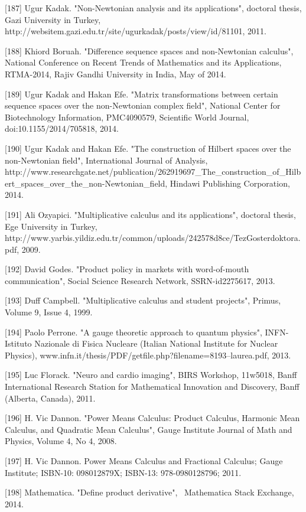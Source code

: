\documentclass[12pt]{article}
\begin{document}
[187] Ugur Kadak. "Non-Newtonian analysis and its applications", doctoral thesis, Gazi University in Turkey, http://websitem.gazi.edu.tr/site/ugurkadak/posts/view/id/81101, 2011.

[188] Khiord Boruah. "Difference sequence spaces and non-Newtonian calculus", National Conference on Recent Trends of Mathematics and its Applications, RTMA-2014, Rajiv Gandhi University in India, May of 2014.

[189] Ugur Kadak and Hakan Efe. "Matrix transformations between certain sequence spaces over the non-Newtonian complex field", National Center for Biotechnology Information, PMC4090579, Scientific World Journal, doi:10.1155/2014/705818, 2014.

[190] Ugur Kadak and Hakan Efe. "The construction of Hilbert spaces over the non-Newtonian field", International Journal of Analysis, http://www.researchgate.net/publication/262919697_The_construction_of_Hilbert_spaces_over_the_non-Newtonian_field, Hindawi Publishing Corporation, 2014.

[191] Ali Ozyapici. "Multiplicative calculus and its applications", doctoral thesis, Ege University in Turkey, http://www.yarbis.yildiz.edu.tr/common/uploads/242578d8ce/TezGosterdoktora.pdf, 2009.

[192] David Godes. "Product policy in markets with word-of-mouth communication", Social Science Research Network, SSRN-id2275617, 2013.

[193] Duff Campbell. "Multiplicative calculus and student projects", Primus, Volume 9, Issue 4, 1999.

[194] Paolo Perrone. "A gauge theoretic approach to quantum physics", INFN-Istituto Nazionale di Fisica Nucleare (Italian National Institute for Nuclear Physics), www.infn.it/thesis/PDF/getfile.php?filename=8193--laurea.pdf, 2013.

[195] Luc Florack. "Neuro and cardio imaging", BIRS Workshop, 11w5018, Banff International Research Station for Mathematical Innovation and Discovery, Banff (Alberta, Canada), 2011.

[196] H. Vic Dannon. "Power Means Calculus: Product Calculus, Harmonic Mean Calculus, and Quadratic Mean Calculus", Gauge Institute Journal of Math and Physics, Volume 4, No 4, 2008.

[197] H. Vic Dannon. Power Means Calculus and Fractional Calculus; Gauge Institute; ISBN-10: 098012879X; ISBN-13: 978-0980128796; 2011.

[198] Mathematica. "Define product derivative",  Mathematica Stack Exchange, 2014.
\end{document}

